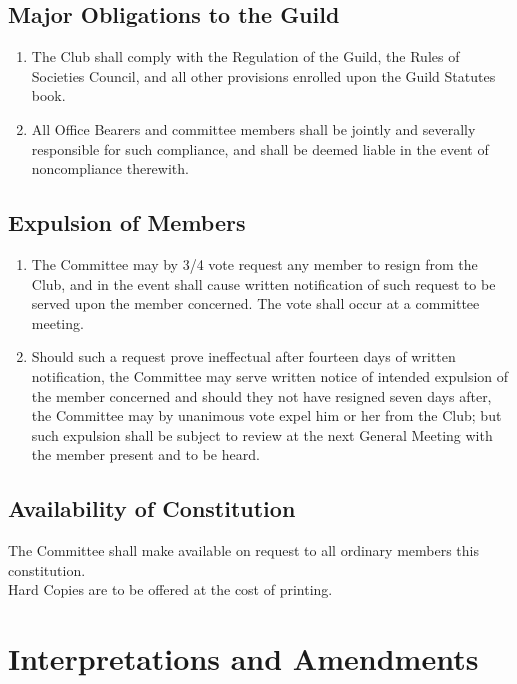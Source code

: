 \documentclass[10pt,a4paper]{report}
\begin{document}
		\section{Major Obligations to the Guild}
			\begin{enumerate}[label=\arabic*]
				\item The Club shall comply with the Regulation of the Guild, the Rules of Societies Council, and all other provisions enrolled upon the Guild Statutes book.
				\item All Office Bearers and committee members shall be jointly and severally responsible for such compliance, and shall be deemed liable in the event of noncompliance therewith.
			\end{enumerate}
		
		\section{Expulsion of Members}
			\begin{enumerate}[label=\arabic*]
				\item The Committee may by 3/4 vote request any member to resign from the Club, and in the event shall cause written notification of such request to be served upon the member concerned. The vote shall occur at a committee meeting.
				\item Should such a request prove ineffectual after fourteen days of written notification, the Committee may serve written notice of intended expulsion of the member concerned and should they not have resigned seven days after, the Committee may by unanimous vote expel him or her from the Club; but such expulsion shall be subject to review at the next General Meeting with the member present and to be heard. 
			\end{enumerate}
		
		\section{Availability of Constitution}
			The Committee shall make available on request to all ordinary members this constitution. \\
			Hard Copies are to be offered at the cost of printing.
	
	\chapter{Interpretations and Amendments}
	
\end{document}
